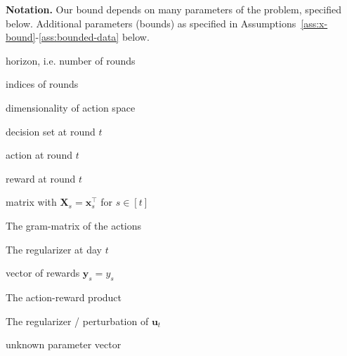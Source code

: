 \documentclass{article}
\renewcommand{\vec}[1]{\bm{#1}}
\newcommand{\defeq}{\coloneq}
\newcommand{\Real}{\mathds{R}}
\newcommand{\D}{\mathcal{D}}
\providecommand\transp{\top}
\let\transpsymbol\transp
\renewcommand{\transp}[1]{#1^\transpsymbol}
\renewcommand{\paragraph}[1]{\vspace{2pt}\noindent\textbf{#1}}
\begin{document}
\paragraph{Notation.}\label{sec:notation} Our bound depends on many parameters of the problem, specified below. Additional parameters (bounds) as specified in Assumptions~\ref{ass:x-bound}-\ref{ass:bounded-data} below.
\begin{multicols}{2}[]
  \nolinenumbers
  \begin{description}[style=sameline,leftmargin=5em,nosep]
  \item[$n$] horizon, i.e. number of rounds
  \item[$s,t$] indices of rounds
  \item[$d$] dimensionality of action space
  \item[$\D_t\subset\Real^d$] decision set at round $t$
  \item[$\vec x_t \in \D_t$] action at round $t$ 
  \item[$y_t \in \Real$] reward at round $t$
  \item[$\vec X_t \in \Real^{t\times d}$] matrix with $\vec X_s = \transp{\vec
      x_s}$ for $s\in[t]$
  \item[$\vec G_t = \transp{\vec X_t}\vec X_t$] The gram-matrix of the actions
  \item[$\vec H_t$] The regularizer at day $t$ 
  \item[$\vec y_t \in \Real^t$] vector of rewards $\vec y_s = y_s$
  \item[$\vec u_t = \transp{\vec X_t} \vec y_t$] The action-reward product 
  \item[$\vec h_t$] The regularizer / perturbation of $\vec u_t$
  \item[$\vec\theta^* \in \Real^d$] unknown parameter vector
  \end{description}
  \linenumbers
\end{multicols}
\end{document}
